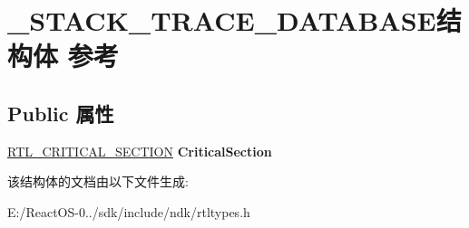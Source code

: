 \hypertarget{struct___s_t_a_c_k___t_r_a_c_e___d_a_t_a_b_a_s_e}{}\section{\+\_\+\+S\+T\+A\+C\+K\+\_\+\+T\+R\+A\+C\+E\+\_\+\+D\+A\+T\+A\+B\+A\+S\+E结构体 参考}
\label{struct___s_t_a_c_k___t_r_a_c_e___d_a_t_a_b_a_s_e}
\subsection*{Public 属性}
\begin{DoxyCompactItemize}
\item 
\mbox{\label{struct___s_t_a_c_k___t_r_a_c_e___d_a_t_a_b_a_s_e_af09755d292581508e397c40b1e453b47}} 
\hyperlink{struct___r_t_l___c_r_i_t_i_c_a_l___s_e_c_t_i_o_n}{R\+T\+L\+\_\+\+C\+R\+I\+T\+I\+C\+A\+L\+\_\+\+S\+E\+C\+T\+I\+ON} {\bfseries Critical\+Section}
\end{DoxyCompactItemize}


该结构体的文档由以下文件生成\+:\begin{DoxyCompactItemize}
\item 
E\+:/\+React\+O\+S-\/0../sdk/include/ndk/rtltypes.\+h\end{DoxyCompactItemize}
